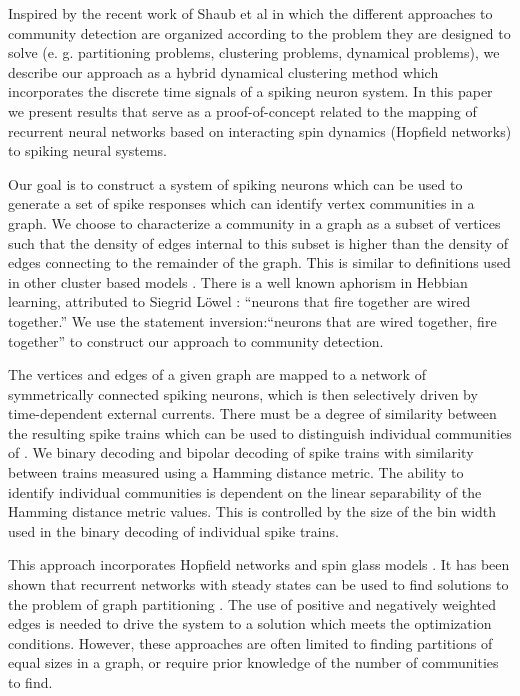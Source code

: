 \documentclass[sigconf]{acmart}
\begin{document}
Inspired by the recent work of Shaub et al \cite{Schaub2017} in which the different approaches to community detection are organized according to the problem they are designed to solve (e. g. partitioning problems, clustering problems, dynamical problems), we describe our approach as a hybrid dynamical clustering method which incorporates the discrete time signals of a spiking neuron system. In this paper we present results that serve as a proof-of-concept related to the mapping of recurrent neural networks based on interacting spin dynamics (Hopfield networks) to spiking neural systems.

Our goal is to construct a system of spiking neurons which can be used to generate a set of spike responses which can identify vertex communities in a graph. We choose to characterize a community in a graph  as a subset of vertices  such that the density of edges internal to this subset is higher than the density of edges connecting to the remainder of the graph. This is similar to definitions used in other cluster based models \cite{NewmanNetworks}. There is a well known aphorism in Hebbian learning, attributed to Siegrid L\"{o}wel \cite{Lowel209}: ``neurons that fire together are wired together.'' We use the statement inversion:``neurons that are wired together, fire together'' to construct our approach to community detection. 

The vertices and edges of a given graph  are mapped to a network of symmetrically connected spiking neurons, which is then selectively driven by time-dependent external currents. There must be a degree of similarity between the resulting spike trains which can be used to distinguish individual communities of . We binary decoding and bipolar decoding of spike trains with similarity between trains measured using a Hamming distance metric. The ability to identify individual communities is dependent on the linear separability of the Hamming distance metric values. This is controlled by the size of the bin width  used in the binary decoding of individual spike trains. 

This approach incorporates Hopfield networks \cite{hopfield1982neural,hopfield1984neurons,hopfield1985neural} and spin glass models \cite{reichardt2004detecting,PhysRevE.74.016110,PhysRevLett.76.3251}.  It has been shown that recurrent networks with steady states can be used to find solutions to the problem of graph partitioning \cite{hertz1991introduction,van1990graph}. The use of positive and negatively weighted edges is needed to drive the system to a solution which meets the optimization conditions. However, these approaches are often limited to finding partitions of equal sizes in a graph, or require prior knowledge of the number of communities to find. 
\end{document}
